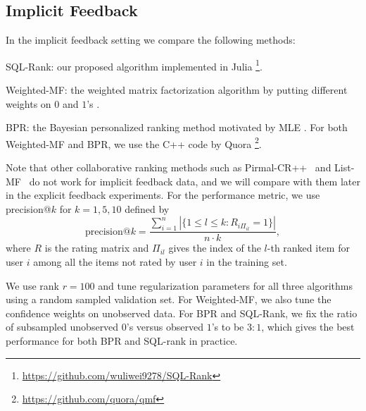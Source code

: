 \documentclass{article}
\begin{document}
\subsection{Implicit Feedback}
In the implicit feedback setting we compare the following methods:
\begin{compactitem}
    \item SQL-Rank: our proposed algorithm implemented in Julia \footnote{\url{https://github.com/wuliwei9278/SQL-Rank}}. 
    \item Weighted-MF: the weighted matrix factorization algorithm by putting different weights on $0$ and $1$'s \cite{hu2008collaborative,hsieh2015pu}.
    \item BPR: the Bayesian personalized ranking method motivated by MLE \cite{rendle2009bpr}. For both Weighted-MF and BPR, we use the C++ code by Quora \footnote{\url{https://github.com/quora/qmf}}. 
\end{compactitem}
Note that other collaborative ranking methods such as Pirmal-CR++~\cite{wu2017large} and List-MF~\cite{shi2010list}
do not work for implicit feedback data, and we will compare with them later in the explicit feedback experiments. 
For the performance metric, we use precision@$k$ for $k = 1, 5, 10$ defined by 
\begin{equation}
    \text{precision}@k = \frac{\sum_{i=1}^{n}|\{1 \leq l \leq k: R_{i\Pi_{il}} = 1\}|}{n \cdot k},
\end{equation} where $R$ is the rating matrix and $\Pi_{il}$ gives the index of the $l$-th ranked item for user $i$ among all the items not rated by user $i$ in the training set. 

We use rank $r = 100$ and tune regularization parameters for all three algorithms using a random sampled validation set. For Weighted-MF, we also tune the confidence weights on unobserved data. For BPR and SQL-Rank, we fix the ratio of subsampled unobserved $0$'s versus observed $1$'s to be $3:1$, which gives the best performance for both BPR and SQL-rank in practice. 
\end{document}
